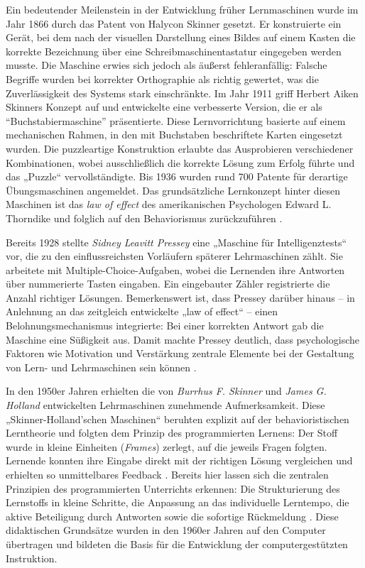 Ein bedeutender Meilenstein in der Entwicklung früher Lernmaschinen wurde im Jahr 1866 durch das Patent von Halycon Skinner gesetzt. Er konstruierte ein Gerät, bei dem nach der visuellen Darstellung eines Bildes auf einem Kasten die korrekte Bezeichnung über eine Schreibmaschinentastatur eingegeben werden musste. Die Maschine erwies sich jedoch als äußerst fehleranfällig: Falsche Begriffe wurden bei korrekter Orthographie als richtig gewertet, was die Zuverlässigkeit des Systems stark einschränkte. Im Jahr 1911 griff Herbert Aiken Skinners Konzept auf und entwickelte eine verbesserte Version, die er als \enquote{Buchstabiermaschine} präsentierte. Diese Lernvorrichtung basierte auf einem mechanischen Rahmen, in den mit Buchstaben beschriftete Karten eingesetzt wurden. Die puzzleartige Konstruktion erlaubte das Ausprobieren verschiedener Kombinationen, wobei ausschließlich die korrekte Lösung zum Erfolg führte und das „Puzzle“ vervollständigte. Bis 1936 wurden rund 700 Patente für derartige Übungsmaschinen angemeldet. Das grundsätzliche Lernkonzept hinter diesen Maschinen ist das \textit{law of effect} des amerikanischen Psychologen Edward L. Thorndike und folglich auf den Behaviorismus zurückzuführen \parencite[S.~3]{niegemann_kompendium_2008}.

Bereits 1928 stellte \textit{Sidney Leavitt Pressey} eine „Maschine für Intelligenztests“ vor, die zu den einflussreichsten Vorläufern späterer Lehrmaschinen zählt. Sie arbeitete mit Multiple-Choice-Aufgaben, wobei die Lernenden ihre Antworten über nummerierte Tasten eingaben. Ein eingebauter Zähler registrierte die Anzahl richtiger Lösungen. Bemerkenswert ist, dass Pressey darüber hinaus -- in Anlehnung an das zeitgleich entwickelte „law of effect“ -- einen Belohnungsmechanismus integrierte: Bei einer korrekten Antwort gab die Maschine eine Süßigkeit aus. Damit machte Pressey deutlich, dass psychologische Faktoren wie Motivation und Verstärkung zentrale Elemente bei der Gestaltung von Lern- und Lehrmaschinen sein können \parencites[S.~705]{benjamin_history_1988}[S.~969f]{skinner_teaching_1958}.

In den 1950er Jahren erhielten die von \textit{Burrhus F. Skinner} und \textit{James G. Holland} entwickelten Lehrmaschinen zunehmende Aufmerksamkeit. Diese „Skinner-Holland’schen Maschinen“ beruhten explizit auf der behavioristischen Lerntheorie und folgten dem Prinzip des programmierten Lernens: Der Stoff wurde in kleine Einheiten (\textit{Frames}) zerlegt, auf die jeweils Fragen folgten. Lernende konnten ihre Eingabe direkt mit der richtigen Lösung vergleichen und erhielten so unmittelbares Feedback \parencite[S.~970ff]{skinner_teaching_1958}. Bereits hier lassen sich die zentralen Prinzipien des programmierten Unterrichts erkennen: Die Strukturierung des Lernstoffs in kleine Schritte, die Anpassung an das individuelle Lerntempo, die aktive Beteiligung durch Antworten sowie die sofortige Rückmeldung \parencite[S.~1971]{bruillard_teaching_2020}. Diese didaktischen Grundsätze wurden in den 1960er Jahren auf den Computer übertragen und bildeten die Basis für die Entwicklung der computergestützten Instruktion.

